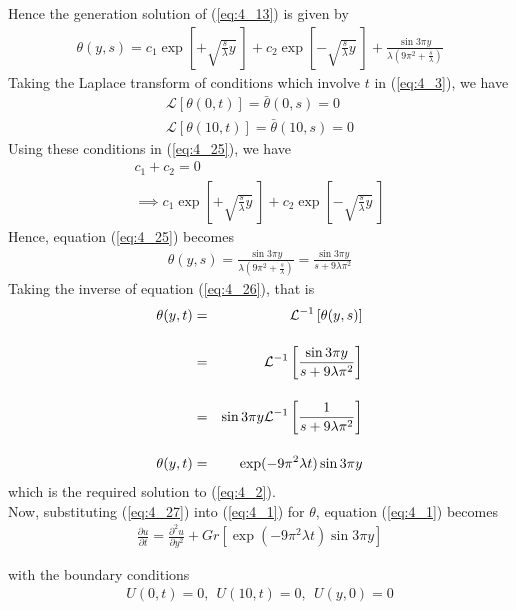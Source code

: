 \documentclass[11pt]{report}
\newcommand{\sps}{\\[0.2cm]}
\newcommand{\spn}[1]{\\[#1cm]}
\newcommand{\refn}[1]{(\ref{#1})}
\newcommand{\refx}[1]{\refn{eq:#1}}
\newcommand{\NI}{\noindent}
\newcommand{\Laplace}{\mathcal{L}}
\newcommand{\sbracket}[1]{\left[#1\right]}
\newcommand{\LFn}[1]{\Laplace \sbracket{#1}}
\newcommand{\InverseL}[1]{\Laplace^{-1}\left[#1\right]}
\begin{document}
	\NI Hence the generation solution of \refx{4_13} is given by
	\begin{eqnarray}
		\theta(y,s) =  c_1\exp\left[+\sqrt{\frac{s}{\lambda}y}~\right] + c_2 \exp\left[-\sqrt{\frac{s}{\lambda}y}~\right] + \frac{\sin 3\pi y}{\lambda (9\pi^2 + \frac{s}{\lambda})}\label{eq:4_25}
	\end{eqnarray}
	Taking the Laplace transform of conditions which involve $t$ in \refx{4_3}, we have
	\begin{eqnarray*}
		\LFn{\theta(0,t)} = \bar{\theta}(0,s) = 0\sps
		\LFn{\theta(10,t)} = \bar{\theta}(10,s) = 0
	\end{eqnarray*}
	Using these conditions in \refx{4_25}, we have
	\begin{gather*}
		c_1 + c_2 = 0\sps
		\implies c_1\exp\left[+\sqrt{\frac{s}{\lambda}y}~\right] + c_2 \exp\left[-\sqrt{\frac{s}{\lambda}y}~\right]
	\end{gather*}
	Hence, equation \refx{4_25} becomes
	\begin{eqnarray}
		\theta(y,s) = \frac{\sin 3\pi y}{\lambda (9\pi^2 + \frac{s}{\lambda})} = \frac{\sin 3\pi y}{s+9\lambda\pi^2}\label{eq:4_26}
	\end{eqnarray}
	Taking the inverse of equation \refx{4_26}, that is
	\begin{eqnarray}
		\theta(y,t) &=& \InverseL{\theta(y,s)}\notag\spn{0.4}
		&=& \InverseL{\frac{\sin 3\pi y}{s+9\lambda\pi^2}}\notag\spn{0.4}
		&=&\sin3\pi y \InverseL{\frac{1}{s+9\lambda\pi^2}}\notag\spn{0.4}
		\theta(y,t) &=& \exp(-9\pi^2\lambda t)\sin3\pi y\label{eq:4_27}
	\end{eqnarray}
	which is the required solution to \refx{4_2}.\\
	
	\NI Now, substituting \refx{4_27} into \refx{4_1} for $\theta$, equation \refx{4_1} becomes
	\begin{eqnarray}
		\frac{\partial u}{\partial t} = \frac{\partial^2 u}{\partial y^2} + Gr\left[ \exp(-9\pi^2\lambda t)\sin3\pi y\right]\label{eq:4_28}
	\end{eqnarray}

	\NI with the boundary conditions
	\begin{eqnarray}
		U(0,t)=0, ~~U(10,t) = 0, ~~U(y,0) = 0\label{eq:4_29}
	\end{eqnarray}
	
\end{document}
